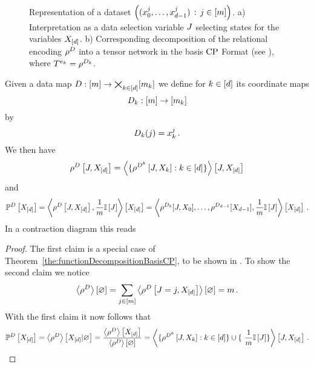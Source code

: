 \begin{figure}[h]
\begin{center}

\end{center}
\caption{
Representation of a dataset $\left(({x_{0}^{j},\ldots,x_{d-1}^{j}})\,:\,j\in[m]\right)$.
a) Interpretation as a data selection variable $J$ selecting states for the variables $X_{[d]}$.
b) Corresponding decomposition of the relational encoding $\rho^{D}$ into a tensor network in the basis $\mathrm{CP}$ Format (see ), where $T^{e_{k}}=\rho^{D_{k}}$.
}
\label{fig:DataDecomposition}
\end{figure}


\begin{theorem}\label{the:empCPRep}
Given a data map $D: [m] \rightarrow \bigtimes_{k\in[d]}[m_{k}]$ we define for $k\in[d]$ its coordinate maps
\[ D_{k} : [m] \rightarrow [m_{k}] \]
by
\[  D_{k}(j) = x_{k}^j \, .  \]
We then have
\begin{align*}
\rho^{D}\left[J,X_{[d]}\right]
= \left\langle 
\{\rho^{D^{k}}\left[J,X_{k}\right] : k\in[d] \}
\right\rangle \left[ J,X_{[d]} \right]
\end{align*}
and
\begin{align*}
\mathbb{P}^{D}\left[X_{[d]}\right]
= \left\langle \rho^{D}\left[J,X_{[d]}\right], \frac{1}{m}\mathbb{I}\left[J\right]\right\rangle \left[ X_{[d]} \right]
= \left\langle \rho^{D_{0}}[J,X_{0}],\ldots,\rho^{D_{d-1}}[X_{d-1}], \frac{1}{m}\mathbb{I}\left[J\right]\right\rangle \left[ X_{[d]} \right] \, .
\end{align*}
In a contraction diagram this reads
\begin{center}

\end{center}
\end{theorem}
\begin{proof}
The first claim is a special case of Theorem~\ref{the:functionDecompositionBasisCP}, to be shown in .
To show the second claim we notice
\[ \left\langle \rho^{D}\right\rangle \left[ \varnothing \right] = \sum_{j\in[m]} \left\langle \rho^{D}\left[J=j,X_{[d]}\right]\right\rangle \left[ \varnothing \right] = m \,  . \]
With the first claim it now follows that
\begin{align*}
\empdistributionat{\shortcatvariables}
= \sbnormationof{\datacore}{\shortcatvariables}
= \frac{\sbcontractionof{\datacore}{\shortcatvariables}}{\sbcontraction{\datacore}}
=  \contractionof{
\{\rencodingofat{\datamap^{\atomenumerator}}{\datvariable,\catvariableof{\atomenumerator}} : \atomenumeratorin \} \cup \{ \frac{1}{\datanum} \onesat{\datvariable} \}
}{\datvariable,\shortcatvariables}  \, .
\end{align*}
\end{proof}


